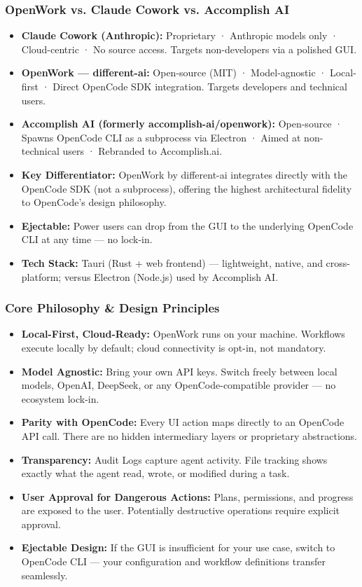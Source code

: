 \begin{frame}[fragile]\frametitle{OpenWork vs. Claude Cowork vs. Accomplish AI}
  \begin{itemize}
    \item \textbf{Claude Cowork (Anthropic):} Proprietary · Anthropic models only · Cloud-centric · No source access. Targets non-developers via a polished GUI.
    \item \textbf{OpenWork — different-ai:} Open-source (MIT) · Model-agnostic · Local-first · Direct OpenCode SDK integration. Targets developers and technical users.
    \item \textbf{Accomplish AI (formerly accomplish-ai/openwork):} Open-source · Spawns OpenCode CLI as a subprocess via Electron · Aimed at non-technical users · Rebranded to Accomplish.ai.
    \item \textbf{Key Differentiator:} OpenWork by different-ai integrates directly with the OpenCode SDK (not a subprocess), offering the highest architectural fidelity to OpenCode's design philosophy.
    \item \textbf{Ejectable:} Power users can drop from the GUI to the underlying OpenCode CLI at any time — no lock-in.
    \item \textbf{Tech Stack:} Tauri (Rust + web frontend) — lightweight, native, and cross-platform; versus Electron (Node.js) used by Accomplish AI.
  \end{itemize}
\end{frame}

\begin{frame}[fragile]\frametitle{Core Philosophy \& Design Principles}
  \begin{itemize}
    \item \textbf{Local-First, Cloud-Ready:} OpenWork runs on your machine. Workflows execute locally by default; cloud connectivity is opt-in, not mandatory.
    \item \textbf{Model Agnostic:} Bring your own API keys. Switch freely between local models, OpenAI, DeepSeek, or any OpenCode-compatible provider — no ecosystem lock-in.
    \item \textbf{Parity with OpenCode:} Every UI action maps directly to an OpenCode API call. There are no hidden intermediary layers or proprietary abstractions.
    \item \textbf{Transparency:} Audit Logs capture agent activity. File tracking shows exactly what the agent read, wrote, or modified during a task.
    \item \textbf{User Approval for Dangerous Actions:} Plans, permissions, and progress are exposed to the user. Potentially destructive operations require explicit approval.
    \item \textbf{Ejectable Design:} If the GUI is insufficient for your use case, switch to OpenCode CLI — your configuration and workflow definitions transfer seamlessly.
  \end{itemize}
\end{frame}

